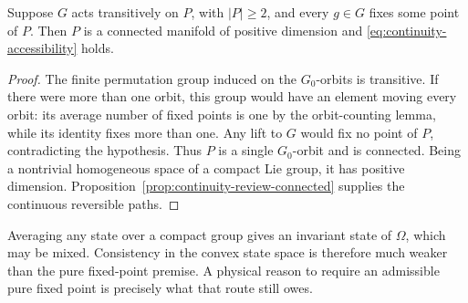 \begin{proposition}
\label{prop:continuity-review-fixed-points}
Suppose $G$ acts transitively on $P$, with $|P|\geq2$, and every $g\in G$
fixes some point of $P$. Then $P$ is a connected manifold of positive
dimension and \eqref{eq:continuity-accessibility} holds.
\end{proposition}
\begin{proof}
The finite permutation group induced on the $G_0$-orbits is transitive.
If there were more than one orbit, this group would have an element moving
every orbit: its average number of fixed points is one by the orbit-counting
lemma, while its identity fixes more than one. Any lift to $G$ would fix no
point of $P$, contradicting the hypothesis. Thus $P$ is a single $G_0$-orbit
and is connected. Being a nontrivial homogeneous space of a compact Lie
group, it has positive dimension. Proposition~\ref{prop:continuity-review-connected}
supplies the continuous reversible paths.
\end{proof}

Averaging any state over a compact group gives an invariant state of
$\Omega$, which may be mixed. Consistency in the convex state space is
therefore much weaker than the pure fixed-point premise. A physical reason
to require an admissible pure fixed point is precisely what that route
still owes.
